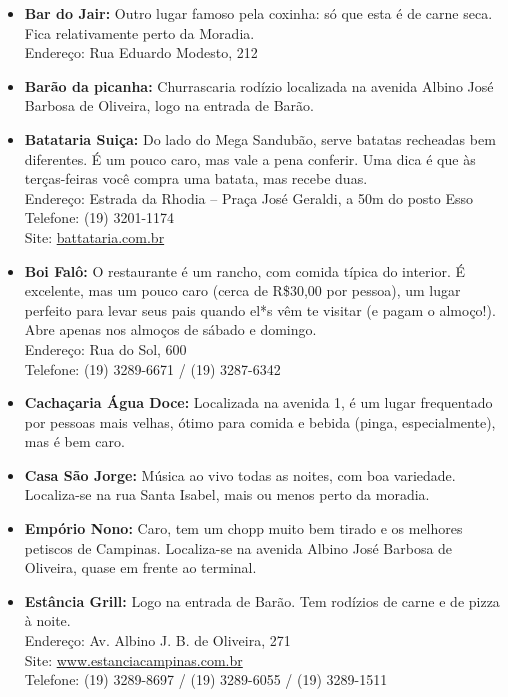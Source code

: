 \begin{itemize}
    \item   \textbf{Bar do Jair:} Outro lugar famoso pela coxinha: só que esta é
        de carne seca. Fica relativamente perto da Moradia.
        \\Endereço: Rua Eduardo Modesto, 212

    \item   \textbf{Barão da picanha:} Churrascaria rodízio localizada na
        avenida Albino José Barbosa de Oliveira, logo na entrada de Barão.

    \item   \textbf{Batataria Suiça:} Do lado do Mega Sandubão, serve batatas
        recheadas bem diferentes. É um pouco caro, mas vale a pena conferir. Uma
        dica é que às terças-feiras você compra uma batata, mas recebe duas.
        \\Endereço: Estrada da Rhodia -- Praça José Geraldi, a 50m do posto Esso
        \\Telefone: (19) 3201-1174
        \\Site: \url{battataria.com.br}

    \item   \textbf{Boi Falô:} O restaurante é um rancho, com comida típica do
        interior. É excelente, mas um pouco caro (cerca de R\$30,00 por pessoa),
        um lugar perfeito para levar seus pais quando el*s vêm te visitar (e
        pagam o almoço!). Abre apenas nos almoços de sábado e domingo.
        \\Endereço: Rua do Sol, 600
        \\Telefone: (19) 3289-6671 / (19) 3287-6342%

    \item   \textbf{Cachaçaria Água Doce:} Localizada na avenida 1, é um lugar
        frequentado por pessoas mais velhas, ótimo para comida e bebida (pinga,
        especialmente), mas é bem caro.

    \item   \textbf{Casa São Jorge:} Música ao vivo todas as noites, com boa
        variedade. Localiza-se na rua Santa Isabel, mais ou menos perto da
        moradia.

    \item   \textbf{Empório Nono:} Caro, tem um chopp muito bem tirado e os
        melhores petiscos de Campinas. Localiza-se na avenida Albino José
        Barbosa de Oliveira, quase em frente ao terminal.

    \item   \textbf{Estância Grill:} Logo na entrada de Barão. Tem rodízios de
        carne e de pizza à noite.
        \\Endereço: Av. Albino J. B. de Oliveira, 271
        \\Site: \url{www.estanciacampinas.com.br}
        \\Telefone: (19) 3289-8697 / (19) 3289-6055 / (19) 3289-1511
    

\end{itemize}
